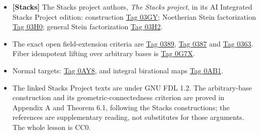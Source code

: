 \documentclass[11pt]{article}
\providecommand{\tightlist}{\setlength{\itemsep}{0pt}\setlength{\parskip}{0pt}}
\begin{document}
\begin{itemize}
\tightlist
\item
  \textbf{{[}Stacks{]}} The Stacks project authors, \emph{The Stacks
  project}, in its AI Integrated Stacks Project edition: construction
  \href{https://kokunoyumeto.github.io/stacks-zh-hans-cn/en/more-morphisms.html\#more-morphisms-lemma-stein-universally-closed}{Tag
  03GY}; Noetherian Stein factorization
  \href{https://kokunoyumeto.github.io/stacks-zh-hans-cn/en/more-morphisms.html\#more-morphisms-theorem-stein-factorization-Noetherian}{Tag
  03H0}; general Stein factorization
  \href{https://kokunoyumeto.github.io/stacks-zh-hans-cn/en/more-morphisms.html\#more-morphisms-theorem-stein-factorization-general}{Tag
  03H2}.
\item
  The exact open field-extension criteria are
  \href{https://kokunoyumeto.github.io/stacks-zh-hans-cn/en/varieties.html\#varieties-lemma-characterize-geometrically-disconnected}{Tag
  0389},
  \href{https://kokunoyumeto.github.io/stacks-zh-hans-cn/en/varieties.html\#varieties-lemma-characterize-geometrically-connected}{Tag
  0387} and
  \href{https://kokunoyumeto.github.io/stacks-zh-hans-cn/en/varieties.html\#varieties-lemma-separably-closed-field-connected-components}{Tag
  0363}. Fiber idempotent lifting over arbitrary bases is
  \href{https://kokunoyumeto.github.io/stacks-zh-hans-cn/en/perfect.html\#perfect-lemma-proper-idempotent-on-fibre}{Tag
  0G7X}.
\item
  Normal targets:
  \href{https://kokunoyumeto.github.io/stacks-zh-hans-cn/en/more-morphisms.html\#more-morphisms-lemma-geometrically-connected-fibres-towards-normal}{Tag
  0AY8}, and integral birational maps
  \href{https://kokunoyumeto.github.io/stacks-zh-hans-cn/en/morphisms.html\#morphisms-lemma-finite-birational-over-normal}{Tag
  0AB1}.
\item
  The linked Stacks Project texts are under GNU FDL 1.2. The
  arbitrary-base construction and its geometric-connectedness criterion
  are proved in Appendix A and Theorem 6.1, following the Stacks
  constructions; the references are supplementary reading, not
  substitutes for those arguments. The whole lesson is CC0.
\end{itemize}
\end{document}
